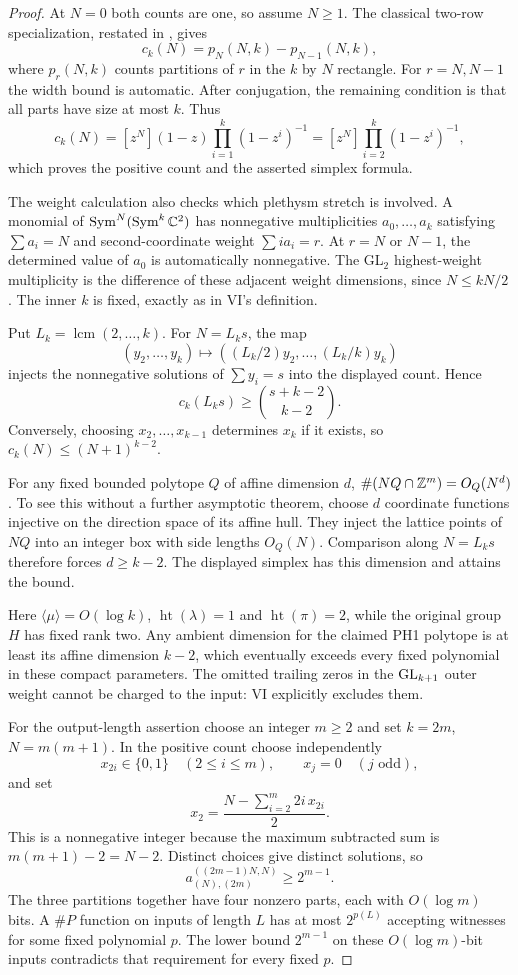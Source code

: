 \documentclass[11pt,a4paper]{article}
\theoremstyle{named}\newtheorem{finding}{Finding}[section]
\theoremstyle{definition}\newtheorem{definition}[finding]{Definition}
\theoremstyle{remark}\newtheorem{remark}[finding]{Remark}
\begin{document}
\begin{proof}
At $N=0$ both counts are one, so assume $N\ge1$.
The classical two-row specialization, restated in
\cite[Lemma~1.3, p.~2]{PPS}, gives
\[
 c_k(N)=p_N(N,k)-p_{N-1}(N,k),
\]
where $p_r(N,k)$ counts partitions of $r$ in the $k$ by $N$ rectangle.
For $r=N,N-1$ the width bound is automatic. After conjugation, the
remaining condition is that all parts have size at most $k$. Thus
\[
 c_k(N)
 =[z^N](1-z)\prod_{i=1}^k(1-z^i)^{-1}
 =[z^N]\prod_{i=2}^k(1-z^i)^{-1},
\]
which proves the positive count and the asserted simplex formula.

The weight calculation also checks which plethysm stretch is involved.
A monomial of $\operatorname{Sym}^N(\operatorname{Sym}^k\mathbb C^2)$ has nonnegative multiplicities
$a_0,\ldots,a_k$ satisfying $\sum a_i=N$ and second-coordinate weight
$\sum ia_i=r$. At $r=N$ or $N-1$, the determined value of $a_0$ is
automatically nonnegative. The GL$_2$ highest-weight multiplicity is
the difference of these adjacent weight dimensions, since
$N\le kN/2$. The inner $k$ is fixed, exactly as in VI's definition.

Put $L_k=\operatorname{lcm}(2,\ldots,k)$. For $N=L_ks$, the map
\[
 (y_2,\ldots,y_k)\longmapsto
       ((L_k/2)y_2,\ldots,(L_k/k)y_k)
\]
injects the nonnegative solutions of $\sum y_i=s$ into the displayed
count. Hence
\[
 c_k(L_ks)\ge\binom{s+k-2}{k-2}.
\]
Conversely, choosing $x_2,\ldots,x_{k-1}$ determines $x_k$ if it
exists, so $c_k(N)\le(N+1)^{k-2}$.

For any fixed bounded polytope $Q$ of affine dimension $d$,
$\#(NQ\cap\mathbb Z^m)=O_Q(N^d)$. To see this without a further asymptotic
theorem, choose $d$ coordinate functions injective on the direction
space of its affine hull. They inject the lattice points of $NQ$
into an integer box with side lengths $O_Q(N)$.
Comparison along $N=L_ks$ therefore forces $d\ge k-2$.
The displayed simplex has this dimension and attains the bound.

Here $\langle\mu\rangle=O(\log k)$,
$\operatorname{ht}(\lambda)=1$ and
$\operatorname{ht}(\pi)=2$, while the original group $H$ has fixed
rank two. Any ambient dimension for the claimed PH1 polytope is at
least its affine dimension $k-2$, which eventually exceeds every
fixed polynomial in these compact parameters. The omitted trailing
zeros in the $\mathrm{GL}_{k+1}$ outer weight cannot be charged to the input:
VI explicitly excludes them.

For the output-length assertion choose an integer $m\ge2$ and set
$k=2m$, $N=m(m+1)$. In the positive count choose independently
\[
 x_{2i}\in\{0,1\}\quad(2\le i\le m),\qquad
 x_j=0\quad(j\text{ odd}),
\]
and set
\[
 x_2=\frac{N-\sum_{i=2}^m2i\,x_{2i}}2.
\]
This is a nonnegative integer because the maximum subtracted sum
is $m(m+1)-2=N-2$. Distinct choices give distinct solutions, so
\[
 a^{((2m-1)N,N)}_{(N),(2m)}\ge2^{m-1}.
\]
The three partitions together have four nonzero parts, each with
$O(\log m)$ bits. A $\#P$ function on inputs of length $L$ has at
most $2^{p(L)}$ accepting witnesses for some fixed polynomial $p$.
The lower bound $2^{m-1}$ on these $O(\log m)$-bit inputs contradicts
that requirement for every fixed $p$.
\end{proof}
\end{document}
